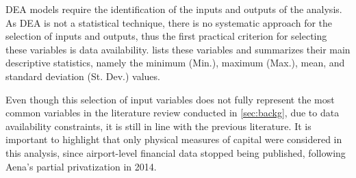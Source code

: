 \vspace{-0.3cm}
DEA models require the identification of the inputs and outputs of the analysis. As DEA is not a
statistical technique, there is no systematic approach for the selection of inputs and outputs, thus the first practical criterion for selecting these
variables is data availability.  lists these variables
and summarizes their main descriptive statistics, namely the minimum (Min.), maximum (Max.), mean,
and standard deviation (St. Dev.) values.

\clearpage
\begin{table}[h!]
  \begin{center}
    \caption{Summary Statistics for Input and Output Variables (2016–2023)}
    \label{tab:variables}
  \end{center}
\end{table}
  \vspace{-0.5cm}
Even though this selection of input variables does not fully
represent the most common variables in the literature review conducted in \autoref{sec:backg}, due to data availability constraints, it is still in line with the previous literature. It is important to highlight that only physical measures of capital were considered in this analysis, since airport-level financial data stopped being published, following Aena’s partial privatization in 2014.

